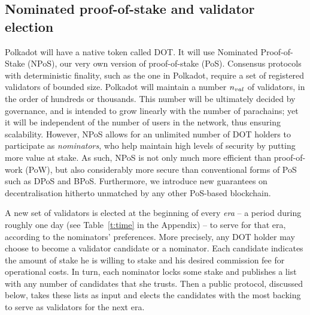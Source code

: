 \subsection{Nominated proof-of-stake and validator election}\label{sec:validators}
Polkadot will have a native token called DOT. It will use Nominated Proof-of-Stake (NPoS), our very own version of proof-of-stake (PoS).
Consensus protocols with deterministic finality, such as the one in Polkadot, 
require a set of registered validators of bounded size.
Polkadot will maintain a number $n_{val}$ of validators, in the order of hundreds or thousands.
This number will be ultimately decided by governance, and is intended to grow linearly with the number of parachains;
yet it will be independent of the number of users in the network, thus ensuring scalability.
However, NPoS allows for an unlimited number of DOT holders to participate as \emph{nominators},
who help maintain high levels of security by putting more value at stake.
As such, NPoS is not only much more efficient than proof-of-work (PoW),
but also considerably more secure than conventional forms of PoS such as DPoS and BPoS. %
Furthermore, we introduce new guarantees on decentralisation hitherto unmatched by any other PoS-based blockchain.

A new set of validators is elected at the beginning of every \emph{era} -- a period during roughly one day (see Table~\ref{t:time} in the Appendix) --
to serve for that era, according to the nominators' preferences.
More precisely, any DOT holder may choose to become a validator candidate or a nominator.
Each candidate indicates the amount of stake he is willing to stake and his desired commission fee for operational costs.
In turn, each nominator locks some stake and publishes a list with any number of candidates that she trusts.
Then a public protocol, discussed below, takes these lists as input and elects the candidates
with the most backing to serve as validators for the next era.

